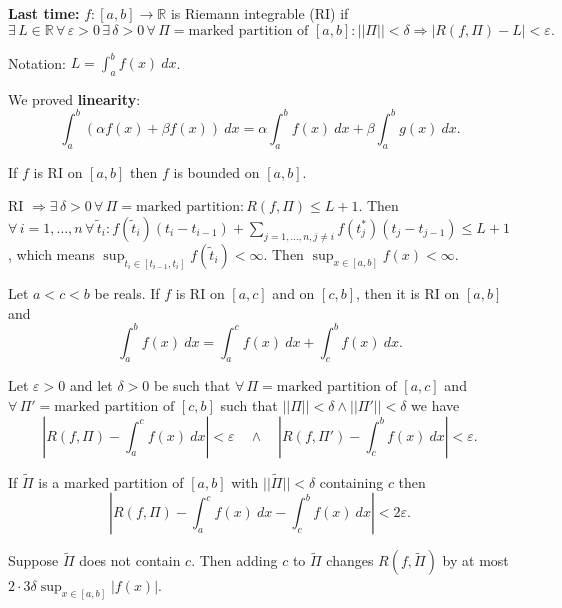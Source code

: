 \documentclass{notes}
\begin{document}
{\boldmath \bfseries Last time:} $f \colon [a, b] \to \mathbb R$ is Riemann integrable (RI) if 
\[
  \exists \, L \in \mathbb R \, \forall \, \varepsilon > 0 \, \exists \, \delta > 0 \, \forall \, \Pi = \text{marked partition of $[a, b]$}: || \Pi || < \delta \Rightarrow \left | R(f, \Pi) - L \right | < \varepsilon.
\]

Notation: $L = \int_a^b f(x)\ dx$.

We proved {\boldmath \bfseries linearity}: 
\[
  \int_a^b (\alpha f(x) + \beta f(x))\ dx = \alpha \int_a^b f(x)\ dx + \beta \int_a^b g(x)\ dx.
\]

\begin{lem}
  If $f$ is RI on $[a, b]$ then $f$ is bounded on $[a, b]$.
\end{lem}

\begin{prf}
  RI $\Rightarrow \exists \, \delta > 0 \, \forall \, \Pi = \text{marked partition}: R(f, \Pi) \leq L + 1$.
  Then $\forall \, i = 1, \dots, n \, \forall \, \tilde t_i: f(\tilde t_i) (t_i - t_{i - 1}) + \sum_{j = 1, \dots, n, j \neq i} f(t_j^*) (t_j - t_{j - 1}) \leq L + 1$, which means $\sup_{\tilde t_i \in [t_{i - 1}, t_i]} f(\tilde t_i) < \infty$.
  Then $\sup_{x \in [a, b]} f(x) < \infty$.
\end{prf}

\begin{lem}[Additivity]
  Let $a < c < b$ be reals.
  If $f$ is RI on $[a, c]$ and on $[c, b]$, then it is RI on $[a, b]$ and 
  \[
    \int_a^b f(x)\ dx = \int_a^c f(x)\ dx + \int_c^b f(x)\ dx.
  \]
\end{lem}

\begin{prf}
  Let $\varepsilon > 0$ and let $\delta > 0$ be such that $\forall \, \Pi = \text{marked partition of $[a, c]$}$ and \\ $\forall \, \Pi' = \text{marked partition of $[c, b]$}$ such that $||\Pi|| < \delta \land ||\Pi'|| < \delta$ we have 
  \[
    \left | R(f, \Pi) - \int_a^c f(x)\ dx \right | < \varepsilon \quad \land \quad \left | R(f, \Pi') - \int_c^b f(x)\ dx \right | < \varepsilon.
  \]
  
  If $\tilde \Pi$ is a marked partition of $[a, b]$ with $||\tilde \Pi|| < \delta$ containing $c$ then 
  \[
    \left | R(f, \Pi) - \int_a^c f(x)\ dx - \int_c^b f(x)\ dx \right | < 2 \varepsilon.
  \]
  
  Suppose $\tilde \Pi$ does not contain $c$.
  Then adding $c$ to $\tilde \Pi$ changes $R(f, \tilde \Pi)$ by at most $2 \cdot 3 \delta \sup_{x \in [a, b]} \left | f(x) \right |$.
\end{prf}
\end{document}
